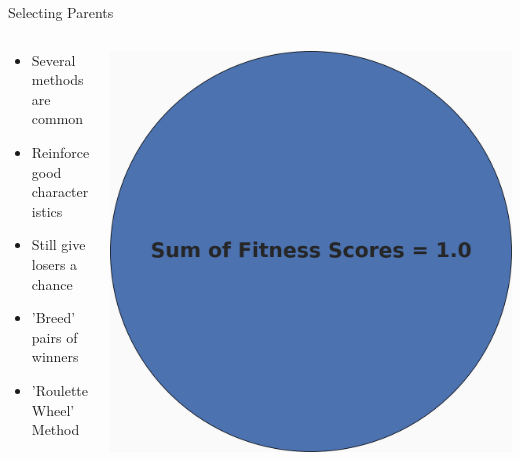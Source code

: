 \documentclass[10pt]{beamer}
\begin{document}
\begin{frame}{Selecting Parents}
	\begin{columns}[c] %
		\begin{column}{.48\textwidth}
			\begin{itemize}[<+->]
				\item {Several methods are common}
				\item {Reinforce good characteristics}
				\item {Still give losers a chance}
				\item {'Breed' pairs of winners}
				\item {'Roulette Wheel' Method}
			\end{itemize}				
		\end{column}
		\hfill
		\begin{column}{0.48\textwidth}
		    \begin{overprint}
			    \includegraphics[width=\linewidth]{images/pie0.PNG}

\end{overprint}
\end{column}
\end{columns}
\end{frame}
\end{document}
